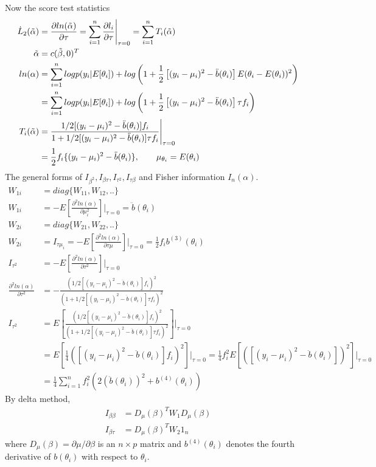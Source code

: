\documentclass[11pt]{article} %
\begin{document}
Now the score test statistics
\begin{align*}
	\dot{L}_2(\Tilde{\alpha}) &= \frac{\partial ln(\Tilde{\alpha})}{\partial \tau}  = \sum_{i=1}^n \frac{\partial l_i}{\partial \tau}\Bigg|_{\tau=0} = \sum_{i=1}^n T_i(\Tilde{\alpha})\\
	\Tilde{\alpha} &= c(\Tilde{\beta}, 0)^T\\
	ln(\alpha) &=\sum_{i=1}^n  log p(y_i|E[\theta_i]) + log \left( 1+ \frac{1}{2} \left[(y_i- \mu_i)^2 -\ddot{b}(\theta_i) \right]E(\theta_i-E(\theta_i))^2 \right)\\
	&= \sum_{i=1}^n  log p(y_i|E[\theta_i]) + log \left( 1+ \frac{1}{2} \left[(y_i- \mu_i)^2 -\ddot{b}(\theta_i) \right]\tau f_i \right)\\
	T_i(\Tilde{\alpha}) &= \frac{1/2 [(y_i-\mu_i)^2-\ddot{b}(\theta_i)] f_i}{1+1/2 [(y_i-\mu_i)^2-\ddot{b}(\theta_i)]\tau f_i}\Bigg|_{\tau=0}\\
	&= \frac{1}{2} f_i\{ (y_i-\mu_i)^2- \ddot{b}(\theta_i)\}, \qquad \mu_{\theta_i} = E(\theta_i)
\end{align*}
The general forms of $I_{\beta^2}, I_{\beta\tau}, I_{\tau^2}, I_{\tau\beta}$ and Fisher information $I_n(\alpha)$.
\begin{align*}
	W_{1i} &= diag\{W_{11}, W_{12},.. \}\\
	W_{1i}&= -E [\frac{\partial^2 ln(\alpha)}{\partial \mu_i^2}]\Bigg|_{\tau = 0} = \ddot{b}(\theta_i)\\
	W_{2i} &= diag\{W_{21}, W_{22},.. \}\\ 
	W_{2i} &=  I_{\tau \mu_i} =-E [\frac{\partial^2 ln(\alpha)}{\partial \tau \mu}]\Bigg|_{\tau = 0} = \frac{1}{2} f_i b^{(3)}(\theta_i)\\
	I_{\tau^2} &=-E [\frac{\partial^2 ln(\alpha)}{\partial \tau^2}]\Bigg|_{\tau = 0} \\
	\frac{\partial^2 ln(\alpha)}{\partial \tau^2} &= -\frac{\left(1/2 [(y_i-\mu_i)^2-\ddot{b}(\theta_i) ] f_i\right)^2}{\left(1+1/2 [(y_i-\mu_i)^2-\ddot{b}(\theta_i)]\tau f_i \right)^2} \\
	I_{\tau^2} &= E \left[  \frac{\left(1/2 [(y_i-\mu_i)^2-\ddot{b}(\theta_i)] f_i \right)^2}{\left(1+1/2 [(y_i-\mu_i)^2-\ddot{b}(\theta_i)]\tau f_i \right)^2} \right]\Bigg|_{\tau = 0}\\
	&= E \left[ \frac{1}{4}\left( [(y_i-\mu_i)^2-\ddot{b}(\theta_i)] f_i \right)^2 \right]\Bigg|_{\tau = 0} = \frac{1}{4} f_i^2 E \left[ \left( [(y_i-\mu_i)^2-\ddot{b}(\theta_i)]  \right)^2 \right]\Bigg|_{\tau = 0}\\
	&= \frac{1}{4} \sum_{i=1}^n  f_i^2 \left( 2 (\ddot{b}(\theta_i))^2 + b^{(4)}(\theta_i) \right)
\end{align*}
By delta method,
\begin{align*}
	I_{\beta \beta} &= D_{\mu}(\beta)^T  W_1 D_{\mu}(\beta) \\
	I_{\beta \tau} &= D_{\mu}(\beta)^T W_2 1_n
\end{align*}
where $D_{\mu}(\beta) = \partial \mu/ \partial \beta$ is an $ n \times p$ matrix and $b^{(4)}(\theta_i)$ denotes the fourth derivative of $b(\theta_i)$ with respect to $\theta_i$. 
\end{document}
